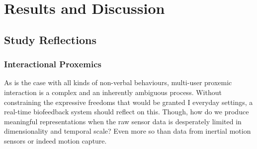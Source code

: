 







\chapter{Results and Discussion}

\section{Study Reflections}

\subsection{Interactional Proxemics}
As is the case with all kinds of non-verbal behaviours, multi-user proxemic interaction is a complex and an inherently ambiguous process. Without constraining the expressive freedoms that would be granted I everyday settings, a real-time biofeedback system should reflect on this. Though, how do we produce meaningful representations when the raw sensor data is desperately limited in dimensionality and temporal scale? Even more so than data from inertial motion sensors  or indeed motion capture.  

